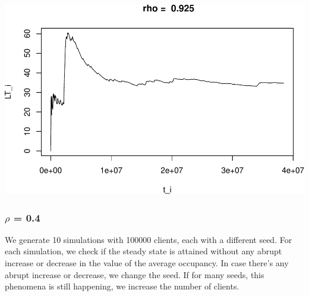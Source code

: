 \documentclass[]{article}
\begin{document}
\includegraphics{003_files/figure-latex/unnamed-chunk-12-4.pdf}

\subsubsection{\texorpdfstring{\(\rho\) =
0.4}{\textbackslash{}rho = 0.4}}\label{rho-0.4}

We generate 10 simulations with 100000 clients, each with a different
seed. For each simulation, we check if the steady state is attained
without any abrupt increase or decrease in the value of the average
occupancy. In case there's any abrupt increase or decrease, we change
the seed. If for many seeds, this phenomena is still happening, we
increase the number of clients.
\end{document}
